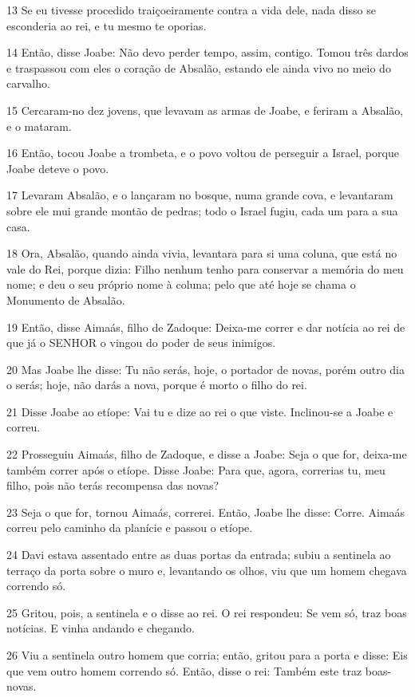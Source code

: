 \par 13 Se eu tivesse procedido traiçoeiramente contra a vida dele, nada disso se esconderia ao rei, e tu mesmo te oporias.
\par 14 Então, disse Joabe: Não devo perder tempo, assim, contigo. Tomou três dardos e traspassou com eles o coração de Absalão, estando ele ainda vivo no meio do carvalho.
\par 15 Cercaram-no dez jovens, que levavam as armas de Joabe, e feriram a Absalão, e o mataram.
\par 16 Então, tocou Joabe a trombeta, e o povo voltou de perseguir a Israel, porque Joabe deteve o povo.
\par 17 Levaram Absalão, e o lançaram no bosque, numa grande cova, e levantaram sobre ele mui grande montão de pedras; todo o Israel fugiu, cada um para a sua casa.
\par 18 Ora, Absalão, quando ainda vivia, levantara para si uma coluna, que está no vale do Rei, porque dizia: Filho nenhum tenho para conservar a memória do meu nome; e deu o seu próprio nome à coluna; pelo que até hoje se chama o Monumento de Absalão.
\par 19 Então, disse Aimaás, filho de Zadoque: Deixa-me correr e dar notícia ao rei de que já o SENHOR o vingou do poder de seus inimigos.
\par 20 Mas Joabe lhe disse: Tu não serás, hoje, o portador de novas, porém outro dia o serás; hoje, não darás a nova, porque é morto o filho do rei.
\par 21 Disse Joabe ao etíope: Vai tu e dize ao rei o que viste. Inclinou-se a Joabe e correu.
\par 22 Prosseguiu Aimaás, filho de Zadoque, e disse a Joabe: Seja o que for, deixa-me também correr após o etíope. Disse Joabe: Para que, agora, correrias tu, meu filho, pois não terás recompensa das novas?
\par 23 Seja o que for, tornou Aimaás, correrei. Então, Joabe lhe disse: Corre. Aimaás correu pelo caminho da planície e passou o etíope.
\par 24 Davi estava assentado entre as duas portas da entrada; subiu a sentinela ao terraço da porta sobre o muro e, levantando os olhos, viu que um homem chegava correndo só.
\par 25 Gritou, pois, a sentinela e o disse ao rei. O rei respondeu: Se vem só, traz boas notícias. E vinha andando e chegando.
\par 26 Viu a sentinela outro homem que corria; então, gritou para a porta e disse: Eis que vem outro homem correndo só. Então, disse o rei: Também este traz boas-novas.
